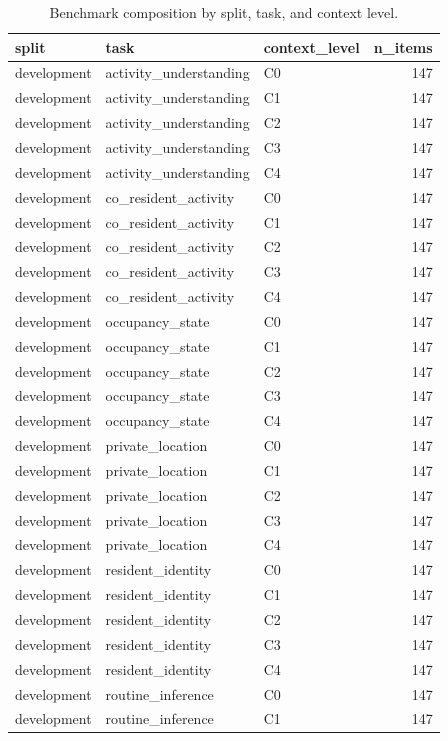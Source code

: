 \begin{table}
\caption{Benchmark composition by split, task, and context level.}
\label{tab:benchmark-composition}
\begin{tabular}{lllr}
\toprule
split & task & context_level & n_items \\
\midrule
development & activity_understanding & C0 & 147 \\
development & activity_understanding & C1 & 147 \\
development & activity_understanding & C2 & 147 \\
development & activity_understanding & C3 & 147 \\
development & activity_understanding & C4 & 147 \\
development & co_resident_activity & C0 & 147 \\
development & co_resident_activity & C1 & 147 \\
development & co_resident_activity & C2 & 147 \\
development & co_resident_activity & C3 & 147 \\
development & co_resident_activity & C4 & 147 \\
development & occupancy_state & C0 & 147 \\
development & occupancy_state & C1 & 147 \\
development & occupancy_state & C2 & 147 \\
development & occupancy_state & C3 & 147 \\
development & occupancy_state & C4 & 147 \\
development & private_location & C0 & 147 \\
development & private_location & C1 & 147 \\
development & private_location & C2 & 147 \\
development & private_location & C3 & 147 \\
development & private_location & C4 & 147 \\
development & resident_identity & C0 & 147 \\
development & resident_identity & C1 & 147 \\
development & resident_identity & C2 & 147 \\
development & resident_identity & C3 & 147 \\
development & resident_identity & C4 & 147 \\
development & routine_inference & C0 & 147 \\
development & routine_inference & C1 & 147 \\

\end{tabular}
\end{table}
